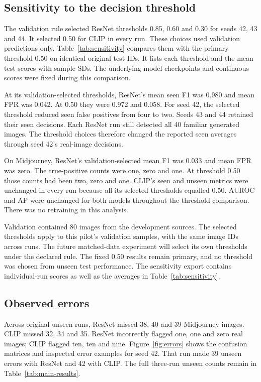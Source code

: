 \subsection{Sensitivity to the decision threshold}
\label{sec:results-sensitivity}
The validation rule selected ResNet thresholds 0.85, 0.60 and 0.30 for seeds 42, 43 and 44. It selected 0.50 for CLIP in every run. These choices used validation predictions only. Table~\ref{tab:sensitivity} compares them with the primary threshold 0.50 on identical original test IDs. It lists each threshold and the mean test scores with sample SDs. The underlying model checkpoints and continuous scores were fixed during this comparison.



At its validation-selected thresholds, ResNet's mean seen F1 was 0.980 and mean FPR was 0.042. At 0.50 they were 0.972 and 0.058. For seed 42, the selected threshold reduced seen false positives from four to two. Seeds 43 and 44 retained their seen decisions. Each ResNet run still detected all 40 familiar generated images. The threshold choices therefore changed the reported seen averages through seed 42's real-image decisions.

On Midjourney, ResNet's validation-selected mean F1 was 0.033 and mean FPR was zero. The true-positive counts were one, zero and one. At threshold 0.50 those counts had been two, zero and one. CLIP's seen and unseen metrics were unchanged in every run because all its selected thresholds equalled 0.50. AUROC and AP were unchanged for both models throughout the threshold comparison. There was no retraining in this analysis.

Validation contained 80 images from the development sources. The selected thresholds apply to this pilot's validation samples, with the same image IDs across runs. The future matched-data experiment will select its own thresholds under the declared rule. The fixed 0.50 results remain primary, and no threshold was chosen from unseen test performance. The sensitivity export contains individual-run scores as well as the averages in Table~\ref{tab:sensitivity}.
\FloatBarrier

\subsection{Observed errors}
\label{sec:results-errors}
Across original unseen runs, ResNet missed 38, 40 and 39 Midjourney images. CLIP missed 32, 34 and 35. ResNet incorrectly flagged one, one and zero real images; CLIP flagged ten, ten and nine. Figure~\ref{fig:errors} shows the confusion matrices and inspected error examples for seed 42. That run made 39 unseen errors with ResNet and 42 with CLIP. The full three-run unseen counts remain in Table~\ref{tab:main-results}.

